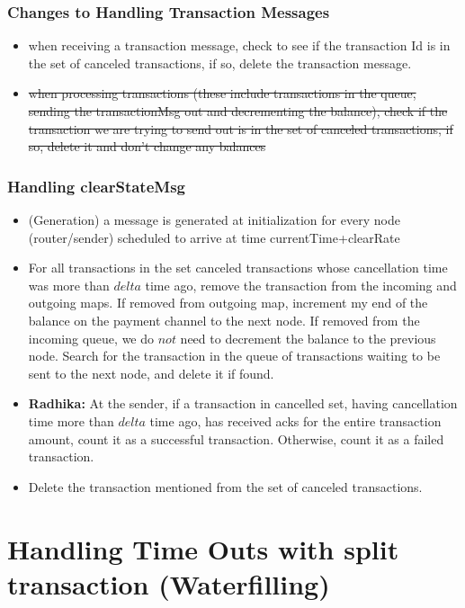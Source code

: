 \documentclass[a4paper]{article}
\newcommand{\radhika}[1]{{\color{red} \textbf{Radhika:} {#1}}}
\begin{document}
\subsubsection{ Changes to Handling Transaction Messages}
    \begin{itemize}
        \item when receiving a transaction message, check to see if the transaction Id is in the set of canceled transactions, if so, delete the transaction message.
        \item \sout{ when processing transactions (these include transactions in the queue, sending the transactionMsg out and decrementing the balance), check if the transaction we are trying to send out is in the set of canceled transactions, if so, delete it and don’t change any balances}

    \end{itemize}
\subsubsection{ Handling clearStateMsg}
    \begin{itemize}
        \item (Generation) a message is generated at initialization for every node (router/sender) scheduled to arrive at time  currentTime+clearRate
        \item For all transactions in the set canceled transactions whose cancellation time  was more than $delta$ time ago, remove the transaction from the incoming and outgoing maps. If removed from outgoing map, increment my end of the balance on the payment channel to the next node. If removed from the incoming queue, we do $not$ need to decrement the balance to the previous node. Search for the transaction in the queue of transactions waiting to be sent to the next node, and delete it if found.
        \item \radhika{At the sender, if a transaction in cancelled set, having cancellation time more than $delta$ time ago, has received acks for the entire transaction amount, count it as a successful transaction. Otherwise, count it as a failed transaction.} 
        \item Delete the transaction mentioned from the set of canceled transactions. 
    \end{itemize}

\section{Handling Time Outs with split transaction (Waterfilling)}
\end{document}
